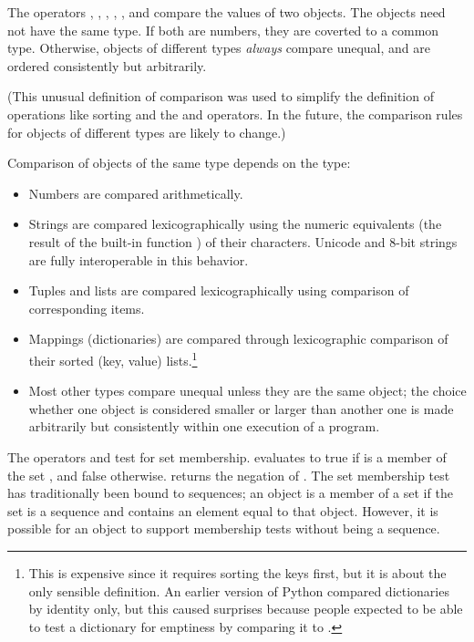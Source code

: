 The operators \code{<}, \code{>}, \code{==}, \code{>=}, \code{<=}, and
\code{!=} compare
the values of two objects.  The objects need not have the same type.
If both are numbers, they are coverted to a common type.  Otherwise,
objects of different types \emph{always} compare unequal, and are
ordered consistently but arbitrarily.

(This unusual definition of comparison was used to simplify the
definition of operations like sorting and the  and
 operators.  In the future, the comparison rules for
objects of different types are likely to change.)

Comparison of objects of the same type depends on the type:

\begin{itemize}

\item
Numbers are compared arithmetically.

\item
Strings are compared lexicographically using the numeric equivalents
(the result of the built-in function ) of their
characters.  Unicode and 8-bit strings are fully interoperable in this
behavior.

\item
Tuples and lists are compared lexicographically using comparison of
corresponding items.

\item
Mappings (dictionaries) are compared through lexicographic
comparison of their sorted (key, value) lists.\footnote{
This is expensive since it requires sorting the keys first,
but it is about the only sensible definition.  An earlier version of
Python compared dictionaries by identity only, but this caused
surprises because people expected to be able to test a dictionary for
emptiness by comparing it to \code{\{\}}.}

\item
Most other types compare unequal unless they are the same object;
the choice whether one object is considered smaller or larger than
another one is made arbitrarily but consistently within one
execution of a program.

\end{itemize}

The operators  and  test for set
membership.   evaluates to true if 
is a member of the set , and false otherwise.   returns the negation of .
The set membership test has traditionally been bound to sequences; an
object is a member of a set if the set is a sequence and contains an
element equal to that object.  However, it is possible for an object
to support membership tests without being a sequence.

